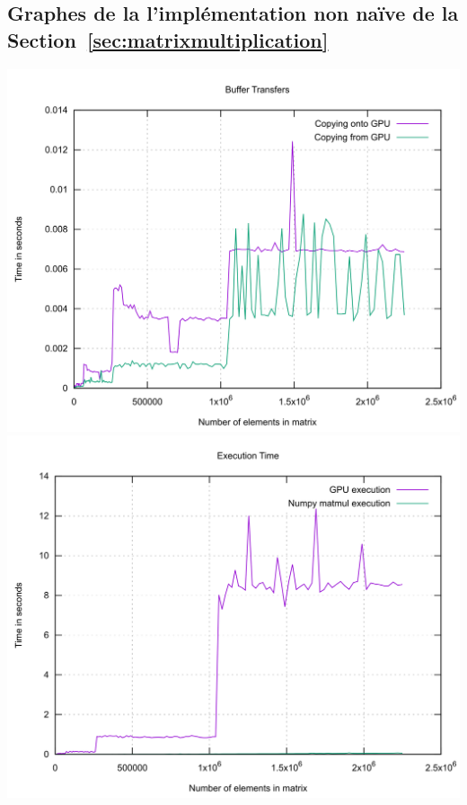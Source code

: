 \documentclass[11pt, a4paper]{article}
\begin{document}
\begin{appendices}
    \section{Graphes de la l'implémentation non naïve de la Section~\ref{sec:matrixmultiplication}}
    \includegraphics[width=\textwidth]{../../resources/buffer_transfer.png}
    \newpage
    \includegraphics[width=\textwidth]{../../resources/execution_time.png}
    \newpage

\end{appendices}
\end{document}

